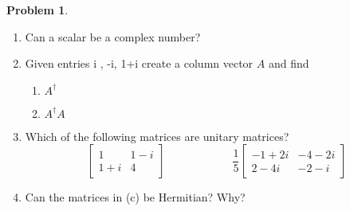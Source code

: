 \documentclass[10pt]{article}
\theoremstyle{definition}
\newtheorem{problem}{Problem}
\begin{document}
\begin{problem}~
\begin{enumerate}[label=(\alph*)]
  \item Can a scalar be a complex number?
  \item Given entries i , -i, 1+i create a column vector $A$ and find
        \begin{enumerate}[label=(\roman*)]
          \item $A^\dagger$
          \item $A^\dagger A$
        \end{enumerate}
  \item Which of the following matrices are unitary matrices?
        $$
          \begin{bmatrix}
            1   & 1-i \\
            1+i & 4
          \end{bmatrix}\qquad\qquad\qquad
          \frac{1}{5}\begin{bmatrix}
            -1+2i & -4-2i \\
            2-4i  & -2-i
          \end{bmatrix}
        $$
  \item Can the matrices in (c) be Hermitian? Why?
\end{enumerate}
\end{problem}
\end{document}
